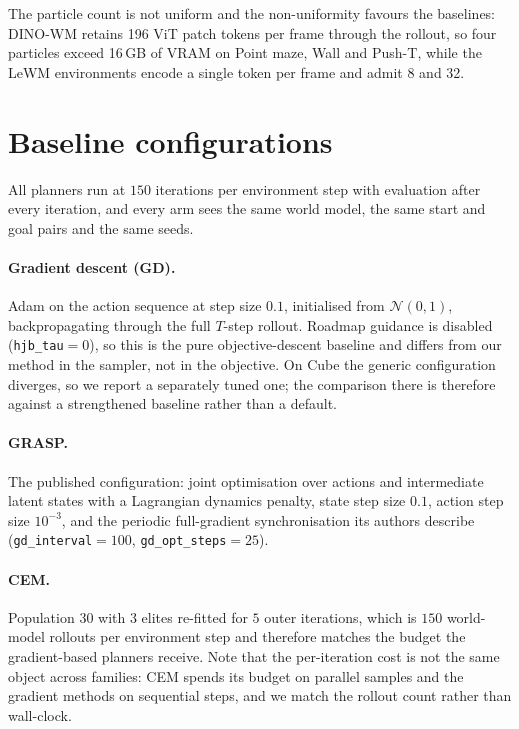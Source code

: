 The particle count is not uniform and the non-uniformity favours the baselines:
DINO-WM retains 196 ViT patch tokens per frame through the rollout, so four
particles exceed 16\,GB of VRAM on Point maze, Wall and Push-T, while the LeWM
environments encode a single token per frame and admit 8 and 32.

\section{Baseline configurations}
\label{app:baselines}

All planners run at $150$ iterations per environment step with evaluation after
every iteration, and every arm sees the same world model, the same start and
goal pairs and the same seeds.

\paragraph{Gradient descent (GD).} Adam on the action sequence at step size
$0.1$, initialised from $\mathcal{N}(0,1)$, backpropagating through the full
$T$-step rollout. Roadmap guidance is disabled (\texttt{hjb\_tau}$=0$), so this
is the pure objective-descent baseline and differs from our method in the
sampler, not in the objective. On Cube the generic configuration diverges, so we
report a separately tuned one; the comparison there is therefore against a
strengthened baseline rather than a default.

\paragraph{GRASP.} The published configuration: joint optimisation over actions
and intermediate latent states with a Lagrangian dynamics penalty, state step
size $0.1$, action step size $10^{-3}$, and the periodic full-gradient
synchronisation its authors describe (\texttt{gd\_interval}$=100$,
\texttt{gd\_opt\_steps}$=25$).

\paragraph{CEM.} Population $30$ with $3$ elites re-fitted for $5$ outer
iterations, which is $150$ world-model rollouts per environment step and
therefore matches the budget the gradient-based planners receive. Note that the
per-iteration cost is not the same object across families: CEM spends its budget
on parallel samples and the gradient methods on sequential steps, and we match
the rollout count rather than wall-clock.

